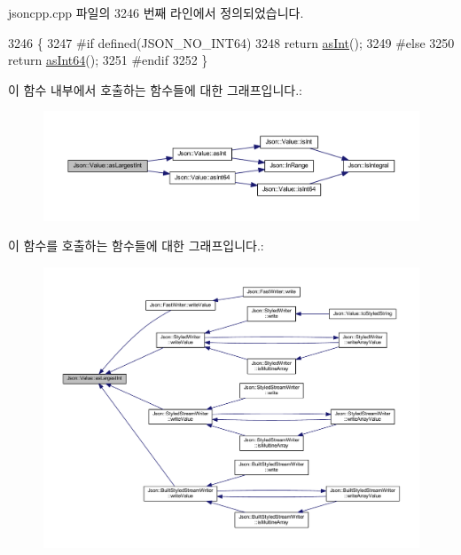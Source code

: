 jsoncpp.\+cpp 파일의 3246 번째 라인에서 정의되었습니다.


\begin{DoxyCode}
3246                                      \{
3247 \textcolor{preprocessor}{#if defined(JSON\_NO\_INT64)}
3248   \textcolor{keywordflow}{return} \hyperlink{class_json_1_1_value_a614d635bc248a592593feb322cd15ab8}{asInt}();
3249 \textcolor{preprocessor}{#else}
3250   \textcolor{keywordflow}{return} \hyperlink{class_json_1_1_value_aa647ac4fe51a2e325c063ebe32262b44}{asInt64}();
3251 \textcolor{preprocessor}{#endif}
3252 \}
\end{DoxyCode}
이 함수 내부에서 호출하는 함수들에 대한 그래프입니다.\+:\nopagebreak
\begin{figure}[H]
\begin{center}
\leavevmode
\includegraphics[width=350pt]{class_json_1_1_value_ab16f2ea2a117a1b3b576acab8b6a700d_cgraph}
\end{center}
\end{figure}
이 함수를 호출하는 함수들에 대한 그래프입니다.\+:\nopagebreak
\begin{figure}[H]
\begin{center}
\leavevmode
\includegraphics[width=350pt]{class_json_1_1_value_ab16f2ea2a117a1b3b576acab8b6a700d_icgraph}
\end{center}
\end{figure}
\mbox{\label{class_json_1_1_value_ad03548101e0bf3d2d9eac75c64a0b8d7}} 
